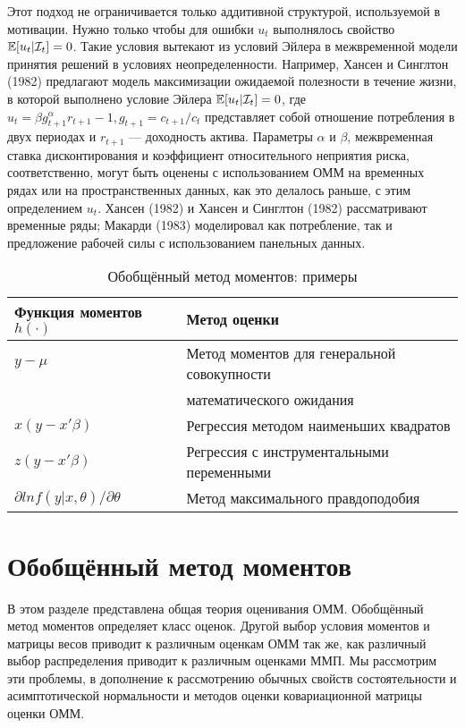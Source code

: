 Этот подход не ограничивается только аддитивной структурой, используемой в мотивации. Нужно только чтобы для ошибки $u_t$ выполнялось свойство $\mathbb{E}[u_t|\mathcal{I}_{t}]=0$. Такие условия
вытекают из условий Эйлера в межвременной модели принятия решений в условиях неопределенности. Например, Хансен и Синглтон (1982) предлагают модель максимизации ожидаемой полезности в течение жизни, в которой выполнено условие Эйлера $\mathbb{E}[u_t|\mathcal{I}_{t}]=0$, где $u_t=\beta g^{\alpha}_{t+1} r_{t+1}-1,g_{t+1}=c_{t+1}/c_t$ представляет собой отношение потребления в двух периодах и $r_{t+1}$ --- доходность актива.
Параметры $\alpha$ и $\beta$, межвременная ставка дисконтирования и коэффициент относительного неприятия риска, соответственно, могут быть оценены с использованием ОММ на временных рядах или на пространственных данных, как это делалось раньше, с этим определением $u_t$. Хансен (1982) и Хансен и Синглтон (1982) рассматривают временные ряды; Макарди (1983) моделировал как потребление, так и предложение рабочей силы с использованием панельных данных.

\begin{table}[h]
\begin{center}
\caption{\label{tab:GMM} Обобщённый метод моментов: примеры}
\begin{tabular}[t]{ll}
\hline
\hline
\bf{Функция моментов $h(\cdot)$} & \bf{Метод оценки} \\
\hline
$y-\mu$ & Метод моментов для  генеральной совокупности \\
& математического ожидания \\
$x(y-x'\beta)$ & Регрессия методом наименьших квадратов \\
$z(y-x'\beta)$ & Регрессия с инструментальными переменными \\
$\partial ln f(y|x,\theta) / \partial \theta$ & Метод максимального правдоподобия \\
\hline
\hline
\end{tabular}
\end{center}
\end{table}

\section{Обобщённый метод моментов}

В этом разделе представлена общая теория оценивания ОММ. Обобщённый метод моментов определяет класс оценок. Другой выбор условия моментов и матрицы весов приводит к различным оценкам ОММ так же, как различный выбор распределения приводит к различным оценками ММП. Мы рассмотрим эти проблемы, в дополнение к рассмотрению обычных свойств состоятельности и асимптотической нормальности и методов оценки ковариационной матрицы оценки ОММ.

